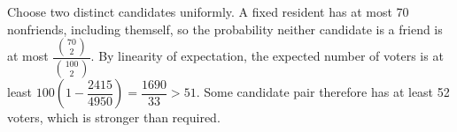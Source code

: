 Choose two distinct candidates uniformly. A fixed resident has at most 70 nonfriends, including themself, so the probability neither candidate is a friend is at most $\dfrac{\binom{70}{2}}{\binom{100}{2}}$. By linearity of expectation, the expected number of voters is at least $100\left(1-\dfrac{2415}{4950}\right)=\dfrac{1690}{33}>51$. Some candidate pair therefore has at least 52 voters, which is stronger than required.
